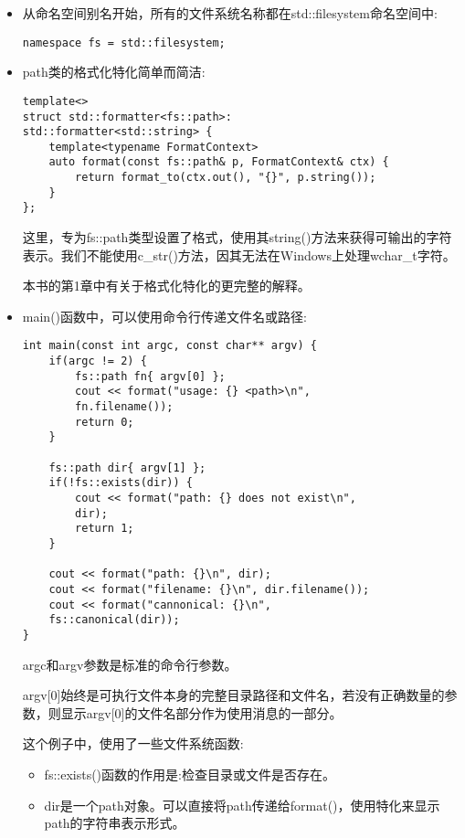 \begin{itemize}
\item 
从命名空间别名开始，所有的文件系统名称都在std::filesystem命名空间中:

\begin{lstlisting}[style=styleCXX]
namespace fs = std::filesystem;
\end{lstlisting}

\item 
path类的格式化特化简单而简洁:

\begin{lstlisting}[style=styleCXX]
template<>
struct std::formatter<fs::path>:
std::formatter<std::string> {
	template<typename FormatContext>
	auto format(const fs::path& p, FormatContext& ctx) {
		return format_to(ctx.out(), "{}", p.string());
	}
};
\end{lstlisting}

这里，专为fs::path类型设置了格式，使用其string()方法来获得可输出的字符表示。我们不能使用c\_str()方法，因其无法在Windows上处理wchar\_t字符。

本书的第1章中有关于格式化特化的更完整的解释。

\item 
main()函数中，可以使用命令行传递文件名或路径:

\begin{lstlisting}[style=styleCXX]
int main(const int argc, const char** argv) {
	if(argc != 2) {
		fs::path fn{ argv[0] };
		cout << format("usage: {} <path>\n",
		fn.filename());
		return 0;
	}

	fs::path dir{ argv[1] };
	if(!fs::exists(dir)) {
		cout << format("path: {} does not exist\n",
		dir);
		return 1;
	}

	cout << format("path: {}\n", dir);
	cout << format("filename: {}\n", dir.filename());
	cout << format("cannonical: {}\n",
	fs::canonical(dir));
}
\end{lstlisting}

argc和argv参数是标准的命令行参数。

argv[0]始终是可执行文件本身的完整目录路径和文件名，若没有正确数量的参数，则显示argv[0]的文件名部分作为使用消息的一部分。

这个例子中，使用了一些文件系统函数:

\begin{itemize}
\item 
fs::exists()函数的作用是:检查目录或文件是否存在。

\item 
dir是一个path对象。可以直接将path传递给format()，使用特化来显示path的字符串表示形式。


\end{itemize}
\end{itemize}
